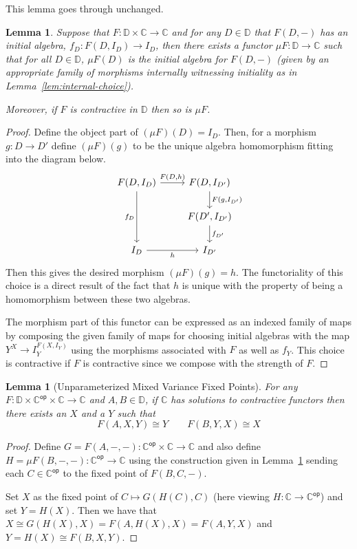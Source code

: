 \documentclass{amsart}
\newtheorem{lem}[thm]{Lemma}
\newcommand{\Ccat}{\ensuremath{\mathbb{C}}}
\newcommand{\Dcat}{\ensuremath{\mathbb{D}}}
\newcommand{\op}[1]{\ensuremath{#1^{\mathsf{op}}}}
\begin{document}
This lemma goes through unchanged.
\begin{lem}\label{lem:mu-construction}
  Suppose that $F : \Dcat \times \Ccat \to \Ccat$ and for any
  $D \in \Dcat$ that $F(D, -)$ has an initial algebra,
  $f_D : F(D, I_D) \to I_D$, then there exists a functor
  $\mu F : \Dcat \to \Ccat$ such that for all $D \in \Dcat$, $\mu F(D)$
  is the initial algebra for $F(D, -)$ (given by an appropriate family
  of morphisms internally witnessing initiality as in
  Lemma~\ref{lem:internal-choice}).

  Moreover, if $F$ is contractive in $\Dcat$ then so is $\mu F$.
\end{lem}
\begin{proof}
  Define the object part of $(\mu F)(D) = I_D$. Then, for a morphism
  $g : D \to D'$ define $(\mu F)(g)$ to be the unique algebra
  homomorphism fitting into the diagram below.
  \[
    \begin{tikzcd}
      F(D, I_D) \ar[dd, swap, "f_D"] \ar[r, "{F(D, h)}"] & F(D, I_{D'}) \ar[d, "{F(g, I_{D'})}"]\\
      & F(D', I_{D'}) \ar[d, "f_{D'}"]\\
      I_D \ar[r, swap, "h"] & I_{D'}
    \end{tikzcd}
  \]
  Then this gives the desired morphism $(\mu F)(g) = h$. The
  functoriality of this choice is a direct result of the fact that $h$
  is unique with the property of being a homomorphism between these
  two algebras.

  The morphism part of this functor can be expressed as an indexed
  family of maps by composing the given family of maps for choosing
  initial algebras with the map $Y^X \to I_Y^{F(X, I_Y)}$ using the
  morphisms associated with $F$ as well as $f_Y$. This choice is
  contractive if $F$ is contractive since we compose with the strength
  of $F$.
\end{proof}

\begin{lem}[Unparameterized Mixed Variance Fixed Points]\label{lem:unparameterized}
  For any $F : \Dcat \times \op{\Ccat} \times \Ccat \to \Ccat$ and
  $A, B \in \Dcat$, if $\Ccat$ has solutions to contractive functors
  then there exists an $X$ and a $Y$ such that
  \[
    F(A, X, Y) \cong Y \qquad F(B, Y, X) \cong X
  \]
\end{lem}
\begin{proof}
  Define $G = F(A, -, -) : \op{\Ccat} \times \Ccat \to \Ccat$ and also
  define $H = \mu F(B, -, -) : \op{\Ccat} \to \Ccat$ using the
  construction given in Lemma~\ref{lem:mu-construction} sending each
  $C \in \op{\Ccat}$ to the fixed point of $F(B, C, -)$.

  Set $X$ as the fixed point of $C \mapsto G(H(C), C)$ (here viewing
  $H : \Ccat \to \op{\Ccat}$) and set $Y = H(X)$. Then we have that
  $X \cong G(H(X), X) = F(A, H(X), X) = F(A, Y, X)$ and
  $Y = H(X) \cong F(B, X, Y)$.
\end{proof}
\end{document}
